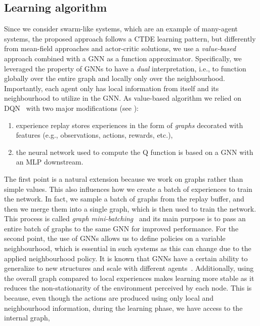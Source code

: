 \subsection{Learning algorithm}
%
Since we consider swarm-like systems, 
 which are an example of many-agent systems, 
 the proposed approach follows a \ac{CTDE} learning pattern,
 but differently from mean-field approaches and actor-critic solutions,
 we use a \emph{value-based} approach combined with a \ac{GNN} as a function approximator.
%
Specifically, we leveraged the property of \acp{GNN} to have a \emph{dual} interpretation, 
i.e., to function globally over the entire graph and locally only over the neighbourhood. 
Importantly, each agent only has local information from itself and its neighbourhood to utilize in the \ac{GNN}.
%
As value-based algorithm we relied on \ac{DQN}~\cite{mnih2015playing} 
with two major modifications (see ): 
\begin{enumerate}
  \item experience replay stores experiences in the form of \emph{graphs} decorated with features (e.g., observations, actions, rewards, etc.),
  \item the neural network used to compute the Q function is based on a \ac{GNN} with an \ac{MLP} downstream.
\end{enumerate}
The first point is a natural extension because we work on graphs rather than simple values.
This also influences how we create a batch of experiences to train the network.
 In fact, we sample a batch of graphs from the replay buffer,
 and then we merge them into a single graph,
 which is then used to train the network.
 This process is called \emph{graph mini-batching}~\cite{DBLP:journals/corr/abs-1903-02428,wang2019deep}
 and its main purpose is to pass an entire batch of graphs to the same \ac{GNN} for improved performance.
%
For the second point,
 the use of \acp{GNN} allows us to define policies on a variable neighbourhood, which is essential in such systems as this can change due to the applied neighbourhood policy.
 It is known that \acp{GNN} have a certain ability to generalize to new structures and scale with different agents~\cite{DBLP:journals/aiopen/ZhouCHZYLWLS20,DBLP:conf/nips/KnyazevTA19}. 
% 
Additionally, 
 using the overall graph compared to local experiences makes learning more stable as it reduces the non-stationarity of the environment perceived by each node.
% 
This is because, even though the actions are produced using only local and neighbourhood information, 
 during the learning phase, we have access to the internal graph, 
